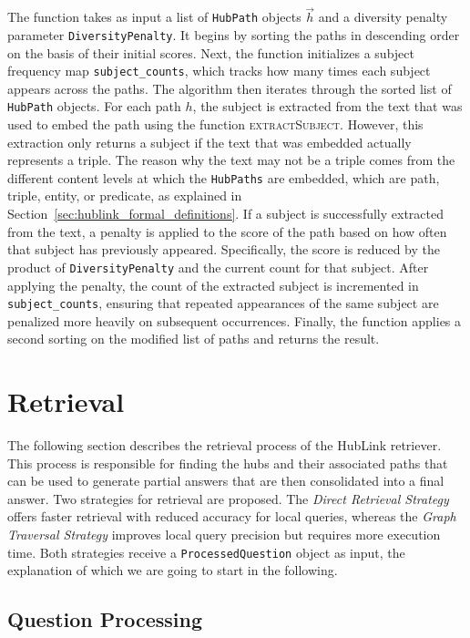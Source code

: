 The function takes as input a list of \texttt{HubPath} objects \(\vec{h}\) and a diversity penalty parameter \texttt{DiversityPenalty}. It begins by sorting the paths in descending order on the basis of their initial scores. Next, the function initializes a subject frequency map \texttt{subject\_counts}, which tracks how many times each subject appears across the paths. The algorithm then iterates through the sorted list of \texttt{HubPath} objects. For each path \(h\), the subject is extracted from the text that was used to embed the path using the function \textsc{extractSubject}. However, this extraction only returns a subject if the text that was embedded actually represents a triple. The reason why the text may not be a triple comes from the different content levels at which the \texttt{HubPaths} are embedded, which are path, triple, entity, or predicate, as explained in Section~\ref{sec:hublink_formal_definitions}. If a subject is successfully extracted from the text, a penalty is applied to the score of the path based on how often that subject has previously appeared. Specifically, the score is reduced by the product of \texttt{DiversityPenalty} and the current count for that subject. After applying the penalty, the count of the extracted subject is incremented in \texttt{subject\_counts}, ensuring that repeated appearances of the same subject are penalized more heavily on subsequent occurrences. Finally, the function applies a second sorting on the modified list of paths and returns the result. 


\section{Retrieval}
\label{sec:hublink_retrieval_strategies}

The following section describes the retrieval process of the HubLink retriever. This process is responsible for finding the hubs and their associated paths that can be used to generate partial answers that are then consolidated into a final answer. Two strategies for retrieval are proposed. The \emph{Direct Retrieval Strategy} offers faster retrieval with reduced accuracy for local queries, whereas the \emph{Graph Traversal Strategy} improves local query precision but requires more execution time. Both strategies receive a \texttt{ProcessedQuestion} object as input, the explanation of which we are going to start in the following.

\subsection{Question Processing}


